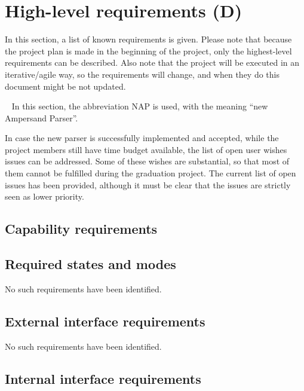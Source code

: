\section{High-level requirements (D)}
\label{sec:requirements}
In this section, a list of known requirements is given.
Please note that because the project plan is made in the beginning of the project, only the highest-level requirements can be described.
Also note that the project will be executed in an iterative/agile way, so the requirements will change, and when they do this document might be not updated.

~\newline\noindent
In this section, the abbreviation NAP is used, with the meaning ``new Ampersand Parser''.
%

In case the new parser is successfully implemented and accepted, while the project members still have time budget available, the list of open user wishes issues can be addressed.
Some of these wishes are substantial, so that most of them cannot be fulfilled during the graduation project.
The current list of open issues has been provided\cite{open-issues}, although it must be clear that the issues are strictly seen as lower priority.

\subsection{Capability requirements}

\subsection{Required states and modes}
No such requirements have been identified.

\subsection{External interface requirements}
No such requirements have been identified.

\subsection{Internal interface requirements}

